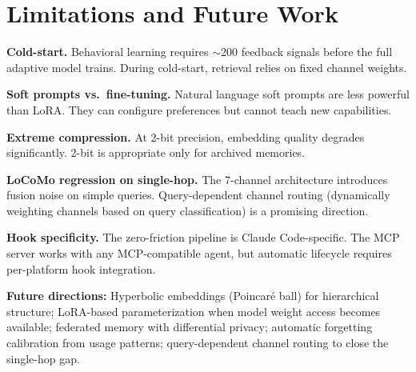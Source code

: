 \section{Limitations and Future Work}
\label{sec:limitations}

\textbf{Cold-start.} Behavioral learning requires $\sim$200 feedback signals before the full adaptive model trains. During cold-start, retrieval relies on fixed channel weights.

\textbf{Soft prompts vs.\ fine-tuning.} Natural language soft prompts are less powerful than LoRA. They can configure preferences but cannot teach new capabilities.

\textbf{Extreme compression.} At 2-bit precision, embedding quality degrades significantly. 2-bit is appropriate only for archived memories.

\textbf{LoCoMo regression on single-hop.} The 7-channel architecture introduces fusion noise on simple queries. Query-dependent channel routing (dynamically weighting channels based on query classification) is a promising direction.

\textbf{Hook specificity.} The zero-friction pipeline is Claude Code-specific. The MCP server works with any MCP-compatible agent, but automatic lifecycle requires per-platform hook integration.

\textbf{Future directions:} Hyperbolic embeddings (Poincar\'{e} ball) for hierarchical structure; LoRA-based parameterization when model weight access becomes available; federated memory with differential privacy; automatic forgetting calibration from usage patterns; query-dependent channel routing to close the single-hop gap.

